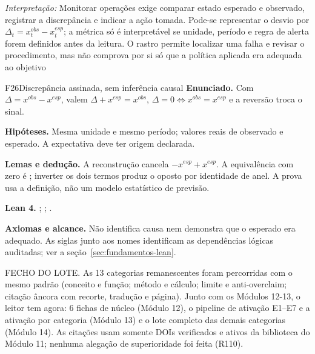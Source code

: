 \noindent\textit{Interpretação:} Monitorar operações exige comparar estado esperado e observado, registrar a discrepância e indicar a ação tomada. Pode-se representar o desvio por $\Delta_t=x_t^{obs}-x_t^{esp}$; a métrica só é interpretável se unidade, período e regra de alerta forem definidos antes da leitura. O rastro permite localizar uma falha e revisar o procedimento, mas não comprova por si só que a política aplicada era adequada ao objetivo  \begin{resultado}
\begin{formalizacao}{F26}{Discrepância assinada, sem inferência causal}
\textbf{Enunciado.} Com $\Delta=x^{obs}-x^{esp}$, valem $\Delta+x^{esp}=x^{obs}$, $\Delta=0\iff x^{obs}=x^{esp}$ e a reversão troca o sinal.

\textbf{Hipóteses.} Mesma unidade e mesmo período; valores reais de observado e esperado. A expectativa deve ter origem declarada.

\textbf{Lemas e dedução.} A reconstrução cancela $-x^{esp}+x^{esp}$. A equivalência com zero é ; inverter os dois termos produz o oposto por identidade de anel. A prova usa a definição, não um modelo estatístico de previsão.

\textbf{Lean 4.} ; ; .

\textbf{Axiomas e alcance.} Não identifica causa nem demonstra que o esperado era adequado. As siglas junto aos nomes identificam as dependências lógicas auditadas; ver a seção~\ref{sec:fundamentos-lean}.
\end{formalizacao}

FECHO DO LOTE. As 13 categorias remanescentes foram percorridas com o mesmo
padrão (conceito e função; método e cálculo; limite e anti-overclaim; citação
âncora com recorte, tradução e página). Junto com os Módulos 12-13, o leitor
tem agora: 6 fichas de núcleo (Módulo 12), o pipeline de ativação E1--E7 e a
ativação por categoria (Módulo 13) e o lote completo das demais categorias
(Módulo 14). As citações usam somente DOIs verificados e ativos da biblioteca
do Módulo 11; nenhuma alegação de superioridade foi feita (R110).
\end{resultado}

